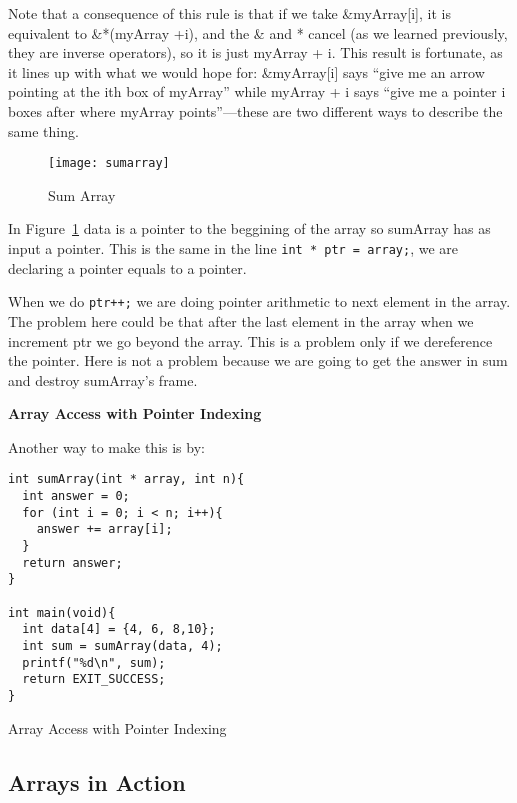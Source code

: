 \documentclass[11pt, a4paper]{article}
\begin{document}
Note that a consequence of this rule is that if we take \&myArray[i], it is equivalent to \&*(myArray +i), and the \& and * cancel (as we learned previously, they are inverse operators), so it is just myArray + i. This result is fortunate, as it lines up with what we would hope for: \&myArray[i] says “give me an arrow pointing at the ith box of myArray” while myArray + i says “give me a pointer i boxes after where myArray points”—these are two different ways to describe the same thing.


\begin{figure}[htpb]
  \centering
  \texttt{[image: sumarray]}
  \caption{Sum Array}
  \label{fig:sumarray}
\end{figure}


In Figure~\ref{fig:sumarray} data is a pointer to the beggining of the array so sumArray has as input a pointer. This is the same in the line \texttt{int * ptr = array;}, we are declaring a pointer equals to a pointer. 

When we do \texttt{ptr++;} we are doing pointer arithmetic to next element in the array. The problem here could be that after the last element in the array when we increment ptr we go beyond the array. This is a problem only if we dereference the pointer. Here is not a problem because we are going to get the answer in sum and destroy sumArray's frame. 


\textbf{Array Access with Pointer Indexing}

Another way to make this is by:


\begin{listing}
\begin{verbatim}
int sumArray(int * array, int n){
  int answer = 0;
  for (int i = 0; i < n; i++){
    answer += array[i];
  }
  return answer;
}

int main(void){
  int data[4] = {4, 6, 8,10};
  int sum = sumArray(data, 4);
  printf("%d\n", sum);
  return EXIT_SUCCESS;
}
\end{verbatim}
\caption{Array Access with Pointer Indexing}
\label{lst:array_access_with_pointer_indexing}
\end{listing}



\subsection{Arrays in Action}%
\label{sub:arrays_in_action}
\end{document}
